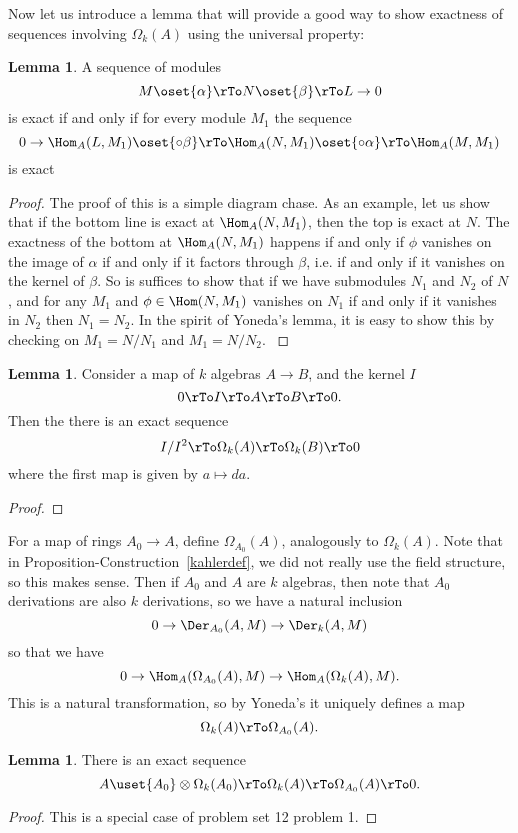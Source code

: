 \documentclass[12 pt]{article}
\theoremstyle{definition}
\newtheorem{lemma}[thm]{Lemma}
\renewcommand{\(}{\left(}
\renewcommand{\)}{\right)}
\begin{document}
Now let us introduce a lemma that will provide a good way to show exactness of sequences involving $\Omega_k(A)$ using the universal property:
\begin{lemma} A sequence of modules
\[M \oset{\alpha}\rTo N \oset{\beta}\rTo L \to 0\]
is exact if and only if for every module $M_1$ the sequence
\[0 \to \Hom_A(L,M_1) \oset{\circ \beta}\rTo \Hom_A(N, M_1) \oset{\circ \alpha}\rTo \Hom_A(M,M_1)\]
is exact
\end{lemma}
\begin{proof}
The proof of this is a simple diagram chase. As an example, let us show that if the bottom line is exact at $\Hom_A(N,M_1)$, then the top is exact at $N$. The exactness of the bottom at $\Hom_A(N,M_1)$ happens if and only if $\phi$ vanishes on the image of $\alpha$ if and only if it factors through $\beta$, i.e. if and only if it vanishes on the kernel of $\beta$. So is suffices to show that if we have submodules $N_1$ and $N_2$ of $N$, and for any $M_1$ and $\phi \in \Hom(N,M_1)$ vanishes on $N_1$ if and only if it vanishes in $N_2$ then $N_1=N_2$. In the spirit of Yoneda's lemma, it is easy to show this by checking on $M_1=N/N_1$ and $M_1=N/N_2$.
\label{homveryleftexact}
\end{proof}


\begin{lemma} Consider a map of $k$ algebras $A \to B$, and the kernel $I$
\[0 \rTo I \rTo A \rTo B \rTo 0.\]
Then the there is an exact sequence
\[I/I^2 \rTo \Omega_k(A) \rTo \Omega_k(B) \rTo 0\]
where the first map is given by $a \mapsto da$.
\end{lemma}
\begin{proof}
\end{proof}

For a map of rings $A_0 \to A$, define $\Omega_{A_0}(A)$, analogously to $\Omega_k(A)$. Note that in Proposition-Construction~\ref{kahlerdef}, we did not really use the field structure, so this makes sense. Then if $A_0$ and $A$ are $k$ algebras, then note that $A_0$ derivations are also $k$ derivations, so we have a natural inclusion
\[0 \to \Der_{A_0}(A,M) \to \Der_k(A,M)\]
so that we have
\[0 \to \Hom_A(\Omega_{A_0}(A),M) \to \Hom_A(\Omega_k(A),M).\]
This is a natural transformation, so by Yoneda's it uniquely defines a map
\[\Omega_k(A) \rTo \Omega_{A_0}(A).\]



\begin{lemma} There is an exact sequence
\[A \uset{A_0}\otimes \Omega_k(A_0) \rTo \Omega_k(A) \rTo \Omega_{A_0}(A) \rTo 0.\]
\end{lemma}
\begin{proof} This is a special case of problem set 12 problem 1.
\end{proof}
\end{document}

